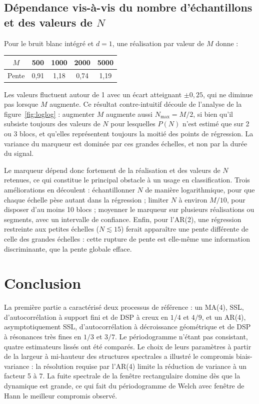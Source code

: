 \documentclass[11pt,a4paper]{article}
\begin{document}
\subsection{Dépendance vis-à-vis du nombre d'échantillons et des valeurs de $N$}

Pour le bruit blanc intégré et $d = 1$, une réalisation par valeur de $M$ donne :

\begin{center}
  \begin{tabular}{ccccc}
    \toprule
    $M$ & 500 & 1000 & 2000 & 5000 \\
    \midrule
    Pente & 0,91 & 1,18 & 0,74 & 1,19 \\
    \bottomrule
  \end{tabular}
\end{center}

Les valeurs fluctuent autour de 1 avec un écart atteignant $\pm 0{,}25$, qui ne diminue pas lorsque $M$ augmente. Ce résultat contre-intuitif découle de l'analyse de la figure~\ref{fig:loglog} : augmenter $M$ augmente aussi $N_{\max} = M/2$, si bien qu'il subsiste toujours des valeurs de $N$ pour lesquelles $P(N)$ n'est estimé que sur 2 ou 3 blocs, et qu'elles représentent toujours la moitié des points de régression. La variance du marqueur est dominée par ces grandes échelles, et non par la durée du signal.

Le marqueur dépend donc fortement de la réalisation et des valeurs de $N$ retenues, ce qui constitue le principal obstacle à un usage en classification. Trois améliorations en découlent : échantillonner $N$ de manière logarithmique, pour que chaque échelle pèse autant dans la régression ; limiter $N$ à environ $M/10$, pour disposer d'au moins 10 blocs ; moyenner le marqueur sur plusieurs réalisations ou segments, avec un intervalle de confiance. Enfin, pour l'AR(2), une régression restreinte aux petites échelles ($N \lesssim 15$) ferait apparaître une pente différente de celle des grandes échelles : cette rupture de pente est elle-même une information discriminante, que la pente globale efface.

\section{Conclusion}

La première partie a caractérisé deux processus de référence : un MA(4), SSL, d'autocorrélation à support fini et de DSP à creux en $1/4$ et $4/9$, et un AR(4), asymptotiquement SSL, d'autocorrélation à décroissance géométrique et de DSP à résonances très fines en $1/3$ et $3/7$. Le périodogramme n'étant pas consistant, quatre estimateurs lissés ont été comparés. Le choix de leurs paramètres à partir de la largeur à mi-hauteur des structures spectrales a illustré le compromis biais-variance : la résolution requise par l'AR(4) limite la réduction de variance à un facteur 5 à 7. La fuite spectrale de la fenêtre rectangulaire domine dès que la dynamique est grande, ce qui fait du périodogramme de Welch avec fenêtre de Hann le meilleur compromis observé.
\end{document}
